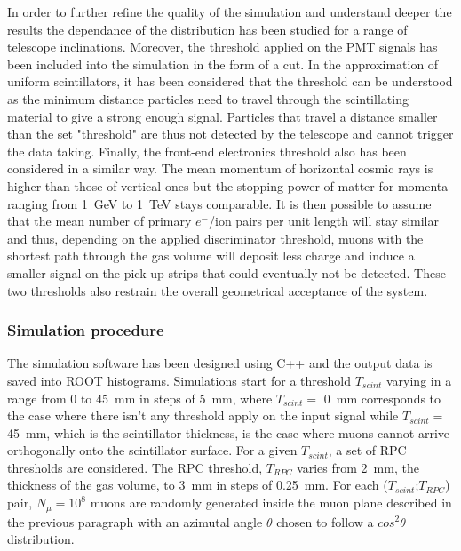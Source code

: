 			In order to further refine the quality of the simulation and understand deeper the results the dependance of the distribution has been studied for a range of telescope inclinations. Moreover, the threshold applied on the PMT signals has been included into the simulation in the form of a cut. In the approximation of uniform scintillators, it has been considered that the threshold can be understood as the minimum distance particles need to travel through the scintillating material to give a strong enough signal. Particles that travel a distance smaller than the set "threshold" are thus not detected by the telescope and cannot trigger the data taking. Finally, the front-end electronics threshold also has been considered in a similar way. The mean momentum of horizontal cosmic rays is higher than those of vertical ones but the stopping power of matter for momenta ranging from \SI{1}{GeV} to \SI{1}{TeV} stays comparable. It is then possible to assume that the mean number of primary $e^-$/ion pairs per unit length will stay similar and thus, depending on the applied discriminator threshold, muons with the shortest path through the gas volume will deposit less charge and induce a smaller signal on the pick-up strips that could eventually not be detected. These two thresholds also restrain the overall geometrical acceptance of the system.
			
		\subsubsection{Simulation procedure}
		\label{sssec:SimProc}
		
			The simulation software has been designed using C++ and the output data is saved into ROOT histograms. Simulations start for a threshold $T_{scint}$ varying in a range from 0 to \SI{45}{mm} in steps of \SI{5}{mm}, where $T_{scint}=$ \SI{0}{mm} corresponds to the case where there isn't any threshold apply on the input signal while $T_{scint}=$ \SI{45}{mm}, which is the scintillator thickness, is the case where muons cannot arrive orthogonally onto the scintillator surface. For a given $T_{scint}$, a set of RPC thresholds are considered. The RPC threshold, $T_{RPC}$ varies from \SI{2}{mm}, the thickness of the gas volume, to \SI{3}{mm} in steps of \SI{0.25}{mm}. For each ($T_{scint}$;$T_{RPC}$) pair, $N_{\mu}=10^8$ muons are randomly generated inside the muon plane described in the previous paragraph with an azimutal angle $\theta$ chosen to follow a $cos^2\theta$ distribution. 
			
